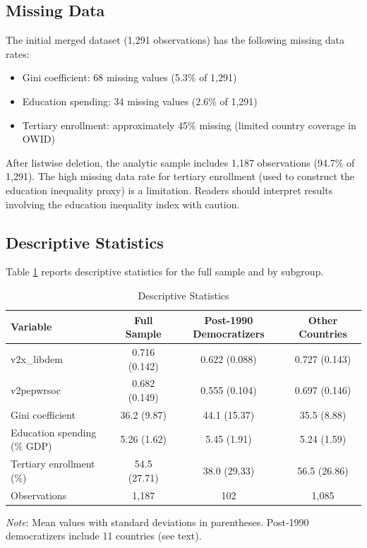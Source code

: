 \documentclass[11pt,letterpaper]{article}
\begin{document}
\subsection{Missing Data}

The initial merged dataset (1,291 observations) has the following missing data rates:
\begin{itemize}
  \item Gini coefficient: 68 missing values (5.3\% of 1,291)
  \item Education spending: 34 missing values (2.6\% of 1,291)
  \item Tertiary enrollment: approximately 45\% missing (limited country coverage in OWID)
\end{itemize}

After listwise deletion, the analytic sample includes 1,187 observations (94.7\% of 1,291). The high missing data rate for tertiary enrollment (used to construct the education inequality proxy) is a limitation. Readers should interpret results involving the education inequality index with caution.

\subsection{Descriptive Statistics}

Table \ref{tab:desc_stats} reports descriptive statistics for the full sample and by subgroup.

\begin{table}[!htbp]
  \centering
  \caption{Descriptive Statistics}
  \label{tab:desc_stats}
  \begin{tabular}{lccc}
    \toprule
    Variable & Full Sample & Post-1990 Democratizers & Other Countries \\
    \midrule
    v2x\_libdem & 0.716 (0.142) & 0.622 (0.088) & 0.727 (0.143) \\
    v2pepwrsoc & 0.682 (0.149) & 0.555 (0.104) & 0.697 (0.146) \\
    Gini coefficient & 36.2 (9.87) & 44.1 (15.37) & 35.5 (8.88) \\
    Education spending (\% GDP) & 5.26 (1.62) & 5.45 (1.91) & 5.24 (1.59) \\
    Tertiary enrollment (\%) & 54.5 (27.71) & 38.0 (29.33) & 56.5 (26.86) \\
    Observations & 1,187 & 102 & 1,085 \\
    \bottomrule
  \end{tabular}
  \vspace{0.2cm}
  \begin{minipage}{\linewidth}
    \footnotesize \textit{Note}: Mean values with standard deviations in parentheses. Post-1990 democratizers include 11 countries (see text).
  \end{minipage}
\end{table}
\end{document}
